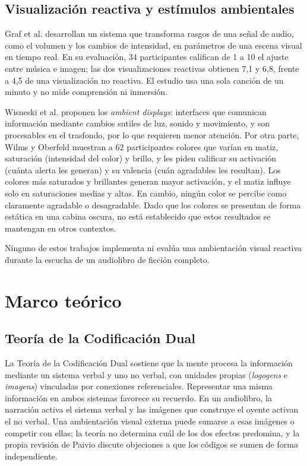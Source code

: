 \documentclass[journal]{IEEEtran}
\begin{document}
\subsection{Visualización reactiva y estímulos ambientales}
Graf et al. \cite{graf2021} desarrollan un sistema que transforma rasgos de una señal de audio, como el volumen y los cambios de intensidad, en parámetros de una escena visual en tiempo real. En su evaluación, 34 participantes califican de 1 a 10 el ajuste entre música e imagen; las dos visualizaciones reactivas obtienen 7,1 y 6,8, frente a 4,5 de una visualización no reactiva. El estudio usa una sola canción de un minuto y no mide comprensión ni inmersión.
 
Wisneski et al. \cite{wisneski1998} proponen los \textit{ambient displays}: interfaces que comunican información mediante cambios sutiles de luz, sonido y movimiento, y son procesables en el trasfondo, por lo que requieren menor atención. Por otra parte, Wilms y Oberfeld \cite{wilmsoberfeld2018} muestran a 62 participantes colores que varían en matiz, saturación (intensidad del color) y brillo, y les piden calificar su activación (cuánta alerta les generan) y su valencia (cuán agradables les resultan). Los colores más saturados y brillantes generan mayor activación, y el matiz influye solo en saturaciones medias y altas. En cambio, ningún color se percibe como claramente agradable o desagradable. Dado que los colores se presentan de forma estática en una cabina oscura, no está establecido que estos resultados se mantengan en otros contextos.
 
Ninguno de estos trabajos implementa ni evalúa una ambientación visual reactiva durante la escucha de un audiolibro de ficción completo.
 
\section{Marco teórico}
 
\subsection{Teoría de la Codificación Dual}
La Teoría de la Codificación Dual \cite{paivio1986, paivio1991} sostiene que la mente procesa la información mediante un sistema verbal y uno no verbal, con unidades propias (\textit{logogens} e \textit{imagens}) vinculadas por conexiones referenciales. Representar una misma información en ambos sistemas favorece su recuerdo. En un audiolibro, la narración activa el sistema verbal y las imágenes que construye el oyente activan el no verbal. Una ambientación visual externa puede sumarse a esas imágenes o competir con ellas; la teoría no determina cuál de los dos efectos predomina, y la propia revisión de Paivio \cite{paivio1991} discute objeciones a que los códigos se sumen de forma independiente.
 
\end{document}
